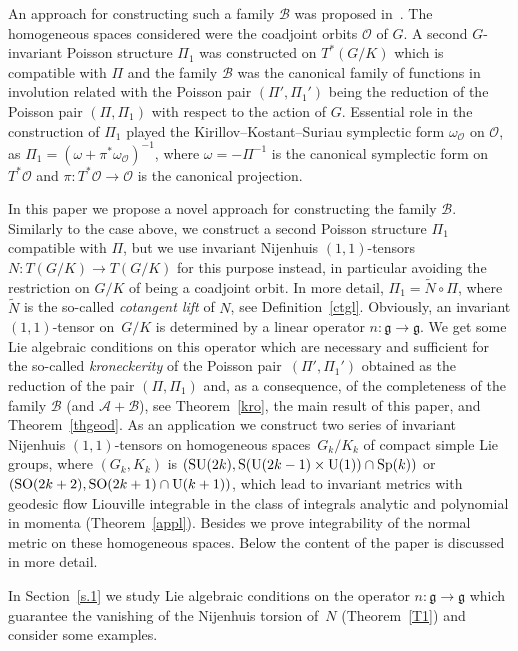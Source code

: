 \documentclass[10pt,a4paper]{amsart}
\numberwithin{equation}{section}
\begin{document}
An approach for constructing such a family $\mathcal{B}$ was proposed in~\cite{p4}. The homogeneous spaces considered were the coadjoint orbits $\mathcal{O}$ of $G$. A second $G$-invariant Poisson structure $\Pi_1$ was constructed on $T^*(G/K)$ which is compatible with $\Pi$ and the family $\mathcal{B}$ was the canonical family of functions in involution related with the Poisson pair $(\Pi',\Pi_1')$ being the reduction of the Poisson pair $(\Pi,\Pi_1)$ with respect to the action of $G$. Essential role in the construction of $\Pi_1$ played the Kirillov--Kostant--Suriau symplectic form $\omega_\mathcal{O}$ on $\mathcal{O}$, as $\Pi_1=(\omega+\pi^*\omega_\mathcal{O})^{-1}$, where $\omega=-\Pi^{-1}$ is the canonical symplectic form on $T^*\mathcal{O}$ and $\pi\colon T^*\mathcal{O}\to \mathcal{O}$ is the canonical projection.

In this paper we propose a novel approach for constructing the family $\mathcal{B}$. Similarly to the case above, we construct a second Poisson structure $\Pi_1$ compatible with $\Pi$, but we use invariant Nijenhuis $(1,1)$-tensors $N\colon T(G/K)\to T(G/K)$ for this purpose instead, in particular avoiding the restriction on $G/K$ of being a coadjoint orbit. In more detail, $\Pi_1=\widetilde{N}\circ\Pi$, where $\widetilde{N}$ is the so-called \emph{cotangent lift} of $N$, see Definition~\ref{ctgl}. Obviously, an invariant $(1,1)$-tensor on~$G/K$ is determined by a linear operator $n\colon \mathfrak{g}\to\mathfrak{g}$. We get some Lie algebraic conditions on this operator which are necessary and sufficient for the so-called \emph{kroneckerity} of the Poisson pair~$(\Pi',\Pi_1')$ obtained as the reduction of the pair $(\Pi,\Pi_1)$ and, as a consequence, of the completeness of the family $\mathcal{B}$ (and $\mathcal{A}+\mathcal {B}$), see Theorem~\ref{kro}, the main result of this paper, and Theorem~\ref{thgeod}. As an application we construct two series of invariant Nijenhuis $(1,1)$-tensors on homogeneous spaces~$G_k/K_k$ of compact simple Lie groups, where $(G_k,K_k)$ is $({\rm SU}(2k),{\rm S}({\rm U}(2k-1)\times {\rm U}(1))\cap {\rm Sp}(k))$ or $({\rm SO}(2k+2),{\rm SO}(2k+1)\cap {\rm U}(k+1))$, which lead to invariant metrics with geodesic flow Liouville integrable in the class of integrals analytic and polynomial in momenta (Theorem~\ref{appl}). Besides we prove integrability of the normal metric on these homogeneous spaces. Below the content of the paper is discussed in more detail.

In Section~\ref{s.1} we study Lie algebraic conditions on the operator $n\colon \mathfrak{g}\to\mathfrak{g}$ which guarantee the vanishing of the Nijenhuis torsion of~$N$ (Theorem~\ref{T1}) and consider some examples.
\end{document}
